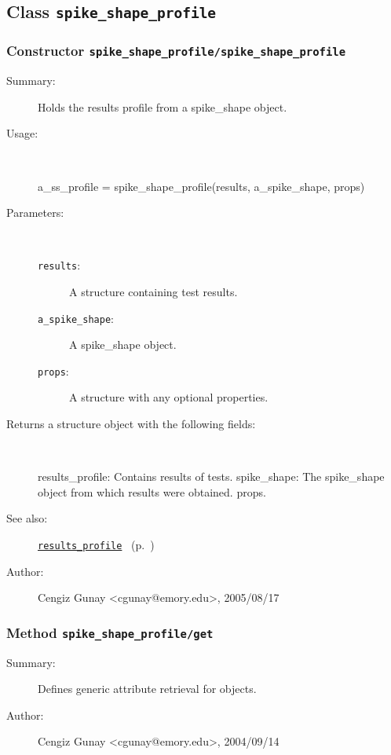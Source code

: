 \subsection{Class \texttt{spike\_shape\_profile}}%
%
\label{ref_spike_shape_profile}%
\hypertarget{ref_spike_shape_profile}{}%
\subsubsection[Constructor \texttt{spike\_shape\_profile}]{Constructor \texttt{spike\_shape\_profile/spike\_shape\_profile}}%
%
\label{ref_spike_shape_profile__spike_shape_profile}%
\hypertarget{ref_spike_shape_profile__spike_shape_profile}{}%
\begin{description}
\item[Summary:]Holds the results profile from a spike\_shape object.
%
\item[Usage:]~%
\begin{lyxcode}%
a\_ss\_profile = spike\_shape\_profile(results, a\_spike\_shape, props)
%
\end{lyxcode}%
%
%
\item[Parameters:]~
\begin{description}%
\item[\texttt{results}:]
 A structure containing test results.
\item[\texttt{a\_spike\_shape}:]
 A spike\_shape object.
\item[\texttt{props}:]
 A structure with any optional properties.
\end{description}%
%
\item[Returns a structure object with the following fields:
]~

	results\_profile: Contains results of tests.
	spike\_shape: The spike\_shape object from which results were obtained.
	props.
%
%
\item[See also:]%
\hyperlink{ref_results_profile}{\texttt{results\_profile}}%
\ (p.~\pageref{ref_results_profile})%
%
%
\item[Author:]%
Cengiz Gunay <cgunay@emory.edu>, 2005/08/17
%
\end{description}
\methodline%
\subsubsection[Method \texttt{get}]{Method \texttt{spike\_shape\_profile/get}}%
%
\label{ref_spike_shape_profile__get}%
\hypertarget{ref_spike_shape_profile__get}{}%
\begin{description}
\item[Summary:]Defines generic attribute retrieval for objects.
%
%
%
%
%
%
%
\item[Author:]%
Cengiz Gunay <cgunay@emory.edu>, 2004/09/14
%
\end{description}
\methodline%
